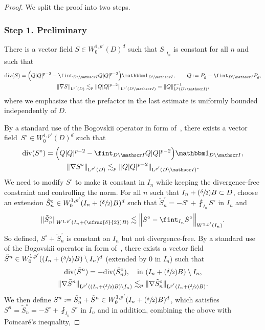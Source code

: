 \documentclass[JEP,XML,SOM,Unicode,published]{cedram}
\let\mathcal\mathscr
\newcommand{\Psfrac}[2]{(\sfrac{#1}{#2})}
\let\mathds\mathbbm
\theoremstyle{plain}
\theoremstyle{definition}
\newcommand{\Ic}{\mathcal I}
\newcommand{\Ld}{\operatorname{L}}
\newcommand{\Div}{{\operatorname{div}}}
\newcommand{\step}[1]{\subsubsection*{Step #1}}
\begin{document}
\begin{proof}
We split the proof into two steps.

\step{1. Preliminary} There is a vector field $S\in W^{1,p'}_0(D)^d$ such that $S|_{I_{n}}$ is constant for all $n$ and such that
\begin{gather*}
\Div(S)=\Big(Q|Q|^{p-2}-\fint_{D\setminus\Ic}Q|Q|^{p-2}\Big)\mathds1_{D\setminus\Ic},
\qquad Q:=P_g-\fint_{D\setminus\Ic}P_g,\\
\|\nabla S\|_{\Ld^{p'}(D)}\lesssim_p \|Q|Q|^{p-2}\|_{\Ld^{p'}(D\setminus\Ic)}=\|Q\|_{\Ld^p(D\setminus\Ic)}^{p-1},
\end{gather*}
where we emphasize that the prefactor in the last estimate is uniformly bounded independently of $D$.

By a standard use of the Bogovskii operator in form of~\cite[Th.\,III.3.1]{Galdi}, there exists a vector field~$S^\circ\in W^{1,p'}_0(D)^d$ such that
\begin{gather*}
\Div(S^\circ)=\Big(Q|Q|^{p-2}-\fint_{D\setminus\Ic}Q|Q|^{p-2}\Big)\mathds1_{D\setminus\Ic},\\
\|\nabla S^\circ\|_{\Ld^{p'}(D)}\lesssim_p \|Q|Q|^{p-2}\|_{\Ld^{p'}(D\setminus\Ic)}.
\end{gather*}
We need to modify $S^\circ$ to make it constant in $I_n$ while keeping the divergence-free constraint and controlling the norm.
For all $n$ such that $I_n+\Psfrac\delta2 B \subset D$, choose an extension $\tilde S^\circ_n\in W_0^{1,p'}(I_n+\Psfrac\delta2 B)^d$ such that $\tilde S^\circ_n=-S^\circ+\fint_{I_n}S^\circ$ in $I_n$ and
\[ \|\tilde S^\circ_n\|_{W^{1,p'}(I_n+\Psfrac\delta2 B)}\lesssim \Big\|S^\circ-\fint_{I_n}S^\circ\Big\|_{W^{1,p'}(I_n)}.\]
So defined, $S^\circ+\tilde S^\circ_n$ is constant on $I_n$ but not divergence-free.
By a standard use of the Bogovskii operator in form of~\cite[Th.\,III.3.1]{Galdi}, there exists a vector field $\tilde S^n\in W^{1,p'}_0((I_n+\Psfrac\delta2 B)\setminus I_n)^d$ (extended by 0 in $I_n$) such that
\begin{gather*}
\Div(\tilde S^n)=-\Div(\tilde S_n^\circ),\quad \text{in }(I_n+\Psfrac\delta2 B)\setminus I_n,\\
\|\nabla\tilde S^n\|_{\Ld^{p'}((I_n+\Psfrac\delta2 B)\setminus I_n)}\lesssim_p \|\nabla \tilde S_n^\circ\|_{\Ld^{p'}(I_n+\Psfrac\delta2 B)}.
\end{gather*}
We then define $S^n:=\tilde S^\circ_n+\tilde S^n\in W^{1,p'}_0(I_n+\Psfrac\delta2 B)^d$, which satisfies $S^n=\tilde S^\circ_n=-S^\circ+\fint_{I_n}S^\circ$ in $I_n$ and in addition, combining the above with Poincaré's inequality,

\end{proof}
\end{document}
